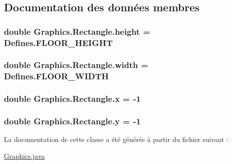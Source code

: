 \subsection{Documentation des données membres}
\hypertarget{classGraphics_1_1Rectangle_a60cd0ad543999184cc40a0573478f05d}{
\subsubsection[{height}]{\setlength{\rightskip}{0pt plus 5cm}double Graphics.\-Rectangle.\-height = {\bf Defines.\-F\-L\-O\-O\-R\-\_\-\-H\-E\-I\-G\-H\-T}\hspace{0.3cm}{\ttfamily [package]}}}\label{classGraphics_1_1Rectangle_a60cd0ad543999184cc40a0573478f05d}
\hypertarget{classGraphics_1_1Rectangle_a1e658c4befb00cda16cc96da9b203ad2}{
\subsubsection[{width}]{\setlength{\rightskip}{0pt plus 5cm}double Graphics.\-Rectangle.\-width = {\bf Defines.\-F\-L\-O\-O\-R\-\_\-\-W\-I\-D\-T\-H}\hspace{0.3cm}{\ttfamily [package]}}}\label{classGraphics_1_1Rectangle_a1e658c4befb00cda16cc96da9b203ad2}
\hypertarget{classGraphics_1_1Rectangle_a7820ea5e4a3f891556e31d0be0704eb5}{
\subsubsection[{x}]{\setlength{\rightskip}{0pt plus 5cm}double Graphics.\-Rectangle.\-x = -\/1\hspace{0.3cm}{\ttfamily [package]}}}\label{classGraphics_1_1Rectangle_a7820ea5e4a3f891556e31d0be0704eb5}
\hypertarget{classGraphics_1_1Rectangle_ac0506420ae549a073b1e9c65e23ed478}{
\subsubsection[{y}]{\setlength{\rightskip}{0pt plus 5cm}double Graphics.\-Rectangle.\-y = -\/1\hspace{0.3cm}{\ttfamily [package]}}}\label{classGraphics_1_1Rectangle_ac0506420ae549a073b1e9c65e23ed478}


La documentation de cette classe a été générée à partir du fichier suivant \-:\begin{DoxyCompactItemize}
\item 
\hyperlink{Graphics_8java}{Graphics.\-java}\end{DoxyCompactItemize}
